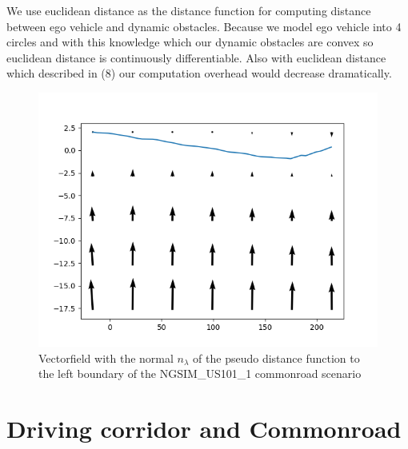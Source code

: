 \documentclass[conference]{IEEEtran}
\begin{document}
We use euclidean distance as the distance function for computing distance between ego vehicle and dynamic obstacles. Because we model ego vehicle into 4 circles and with this knowledge which our dynamic obstacles are convex so euclidean distance is continuously differentiable. Also with euclidean distance which described in (8) our computation overhead would decrease dramatically.
\begin{figure}[h]
\begin{center}
\includegraphics[scale = 0.5]{dist_left.png}
\end{center}
\caption{Vectorfield with the normal $n_\lambda$ of the pseudo distance function to the left boundary of the NGSIM\_US101\_1 commonroad scenario}
\label{ph1}
\end{figure}

\section{Driving corridor and Commonroad}
\end{document}
